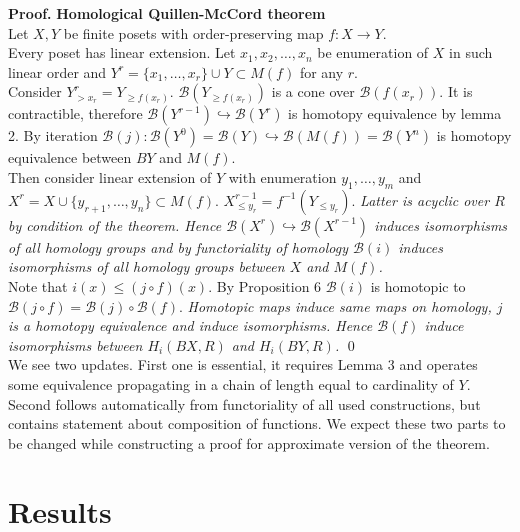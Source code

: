\documentclass[a4paper, 12pt]{article}
\theoremstyle{definition}
\theoremstyle{remark}
\newenvironment{pf}{\noindent\textbf{Proof.}}{\qed}
\renewcommand{\leq}{\leqslant}
\renewcommand{\geq}{\geqslant}
\begin{document}
\begin{pf} \textbf{Homological Quillen-McCord theorem}\\
Let $X, Y$ be finite posets with order-preserving map $f : X \to Y$.\\

Every poset has linear extension. Let $x_1, x_2, \ldots, x_n$ be enumeration of $X$ in such linear order and $Y^r = \{x_1,\ldots,x_r\} \cup Y \subset M(f)$ for any $r$.\\

Consider $Y^r_{>x_r} = Y_{\geq f(x_r)}$. $\mathcal{B}(Y_{\geq f(x_r)})$ is a cone over $\mathcal{B}(f(x_r))$. It is contractible, therefore $\mathcal{B}(Y^{r-1}) \hookrightarrow \mathcal{B}(Y^{r})$ is homotopy equivalence by lemma 2. By iteration $\mathcal{B}(j) : \mathcal{B}(Y^{0}) = \mathcal{B}(Y) \hookrightarrow \mathcal{B}(M(f)) = \mathcal{B}(Y^n)$ is homotopy equivalence between $BY$ and $M(f)$.\\

Then consider linear extension of $Y$ with enumeration $y_1,\ldots,y_m$ and $X^r = X \cup \{y_{r+1},\ldots,y_n\} \subset M(f)$. $X^{r-1}_{\leq y_r} = f^{-1}(Y_{\leqslant y_r})$. \textit{Latter is acyclic over $R$ by condition of the theorem. Hence $\mathcal{B}(X^{r}) \hookrightarrow \mathcal{B}(X^{r-1})$ induces isomorphisms of all homology groups and by functoriality of homology $\mathcal{B}(i)$ induces isomorphisms of all homology groups between $X$ and $M(f)$.}\\

Note that $i(x) \leqslant (j \circ f)(x)$. By Proposition 6 $\mathcal{B}(i)$ is homotopic to $\mathcal{B}(j \circ f) = \mathcal{B}(j) \circ \mathcal{B}(f)$. \textit{Homotopic maps induce same maps on homology, $j$ is a homotopy equivalence and induce isomorphisms. Hence $\mathcal{B}(f)$ induce isomorphisms between $H_i(BX,R)$ and $H_i(BY,R)$.}
\end{pf}\\

We see two updates. First one is essential, it requires Lemma 3 and operates some equivalence propagating in a chain of length equal to cardinality of $Y$. Second follows automatically from functoriality of all used constructions, but contains statement about composition of functions. We expect these two parts to be changed while constructing a proof for approximate version of the theorem.

\section{Results}
\end{document}
